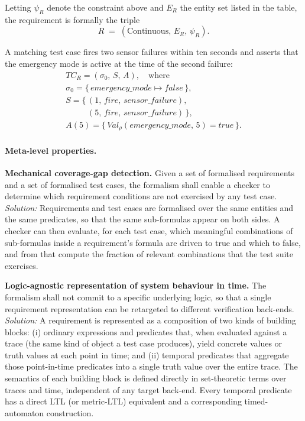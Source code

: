 Letting $\psi_R$ denote the constraint above and $E_R$ the entity set listed in the table, the requirement is formally the triple
    {\footnotesize
        \[
            R \;=\; (\mathrm{Continuous},\, E_R,\, \psi_R).
        \]
    }

A matching test case fires two sensor failures within ten seconds and asserts that the emergency mode is active at the time of the second failure:
{\footnotesize
\begin{gather*}
    \mathit{TC}_R = (\sigma_0,\, S,\, A), \quad \text{where} \\
    \sigma_0 = \{\, \mathit{emergency\_mode} \mapsto \mathit{false} \,\}, \\
    S = \{\, (1,\, \mathit{fire},\, \mathit{sensor\_failure}), \\
    \phantom{S = \{\,} (5,\, \mathit{fire},\, \mathit{sensor\_failure}) \,\}, \\
    A(5) = \{\, \mathit{Val}_\rho(\mathit{emergency\_mode},\, 5) = \mathit{true} \,\}.
\end{gather*}
}

\paragraph{Meta-level properties.}

\textbf{Mechanical coverage-gap detection.} Given a set of formalised requirements and a set of formalised test cases, the formalism shall enable a checker to determine which requirement conditions are not exercised by any test case. \textit{Solution:} Requirements and test cases are formalised over the same entities and the same predicates, so that the same sub-formulas appear on both sides. A checker can then evaluate, for each test case, which meaningful combinations of sub-formulas inside a requirement's formula are driven to true and which to false, and from that compute the fraction of relevant combinations that the test suite exercises.

\textbf{Logic-agnostic representation of system behaviour in time.} The formalism shall not commit to a specific underlying logic, so that a single requirement representation can be retargeted to different verification back-ends. \textit{Solution:} A requirement is represented as a composition of two kinds of building blocks: (i) ordinary expressions and predicates that, when evaluated against a trace (the same kind of object a test case produces), yield concrete values or truth values at each point in time; and (ii) temporal predicates that aggregate those point-in-time predicates into a single truth value over the entire trace. The semantics of each building block is defined directly in set-theoretic terms over traces and time, independent of any target back-end. Every temporal predicate has a direct LTL (or metric-LTL) equivalent and a corresponding timed-automaton construction.

